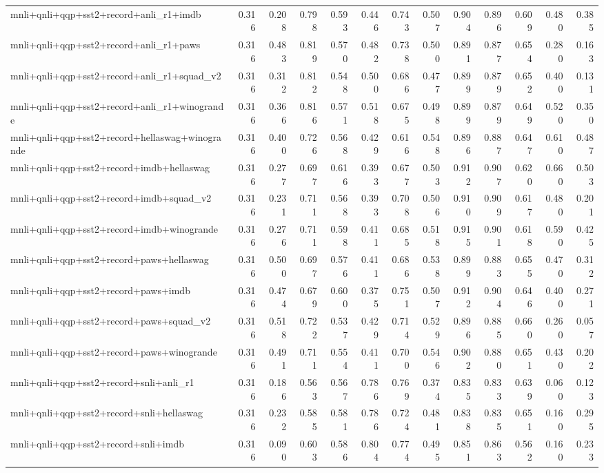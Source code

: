 \begin{table}[t]
\begin{tabular}{lrrrrrrrrrrrr}
    mnli+qnli+qqp+sst2+record+anli\_r1+imdb & 0.316 & 0.208 & 0.798 & 0.593 & 0.446 & 0.743 & 0.507 & 0.904 & 0.896 & 0.609 & 0.480 & 0.385 \\
    mnli+qnli+qqp+sst2+record+anli\_r1+paws & 0.316 & 0.483 & 0.819 & 0.570 & 0.482 & 0.738 & 0.500 & 0.891 & 0.877 & 0.654 & 0.280 & 0.163 \\
    mnli+qnli+qqp+sst2+record+anli\_r1+squad\_v2 & 0.316 & 0.312 & 0.812 & 0.548 & 0.500 & 0.686 & 0.477 & 0.899 & 0.879 & 0.652 & 0.400 & 0.131 \\
    mnli+qnli+qqp+sst2+record+anli\_r1+winogrande & 0.316 & 0.366 & 0.816 & 0.571 & 0.518 & 0.675 & 0.498 & 0.899 & 0.879 & 0.649 & 0.520 & 0.350 \\
    mnli+qnli+qqp+sst2+record+hellaswag+winogrande & 0.316 & 0.400 & 0.726 & 0.568 & 0.429 & 0.616 & 0.548 & 0.896 & 0.887 & 0.647 & 0.610 & 0.487 \\
    mnli+qnli+qqp+sst2+record+imdb+hellaswag & 0.316 & 0.277 & 0.697 & 0.616 & 0.393 & 0.677 & 0.503 & 0.912 & 0.907 & 0.620 & 0.660 & 0.503 \\
    mnli+qnli+qqp+sst2+record+imdb+squad\_v2 & 0.316 & 0.231 & 0.711 & 0.568 & 0.393 & 0.708 & 0.506 & 0.910 & 0.909 & 0.617 & 0.480 & 0.201 \\
    mnli+qnli+qqp+sst2+record+imdb+winogrande & 0.316 & 0.276 & 0.711 & 0.598 & 0.411 & 0.685 & 0.518 & 0.915 & 0.901 & 0.618 & 0.590 & 0.425 \\
    mnli+qnli+qqp+sst2+record+paws+hellaswag & 0.316 & 0.500 & 0.697 & 0.576 & 0.411 & 0.686 & 0.538 & 0.899 & 0.883 & 0.655 & 0.470 & 0.312 \\
    mnli+qnli+qqp+sst2+record+paws+imdb & 0.316 & 0.474 & 0.679 & 0.600 & 0.375 & 0.751 & 0.507 & 0.912 & 0.904 & 0.646 & 0.400 & 0.271 \\
    mnli+qnli+qqp+sst2+record+paws+squad\_v2 & 0.316 & 0.518 & 0.722 & 0.537 & 0.429 & 0.714 & 0.529 & 0.896 & 0.885 & 0.660 & 0.260 & 0.057 \\
    mnli+qnli+qqp+sst2+record+paws+winogrande & 0.316 & 0.491 & 0.711 & 0.554 & 0.411 & 0.700 & 0.546 & 0.902 & 0.880 & 0.651 & 0.430 & 0.202 \\
    mnli+qnli+qqp+sst2+record+snli+anli\_r1 & 0.316 & 0.186 & 0.563 & 0.567 & 0.786 & 0.769 & 0.374 & 0.835 & 0.833 & 0.639 & 0.060 & 0.123 \\
    mnli+qnli+qqp+sst2+record+snli+hellaswag & 0.316 & 0.232 & 0.585 & 0.581 & 0.786 & 0.724 & 0.481 & 0.838 & 0.835 & 0.651 & 0.160 & 0.295 \\
    mnli+qnli+qqp+sst2+record+snli+imdb & 0.316 & 0.090 & 0.603 & 0.586 & 0.804 & 0.774 & 0.495 & 0.851 & 0.863 & 0.562 & 0.160 & 0.233 \\

\end{tabular}
\end{table}
